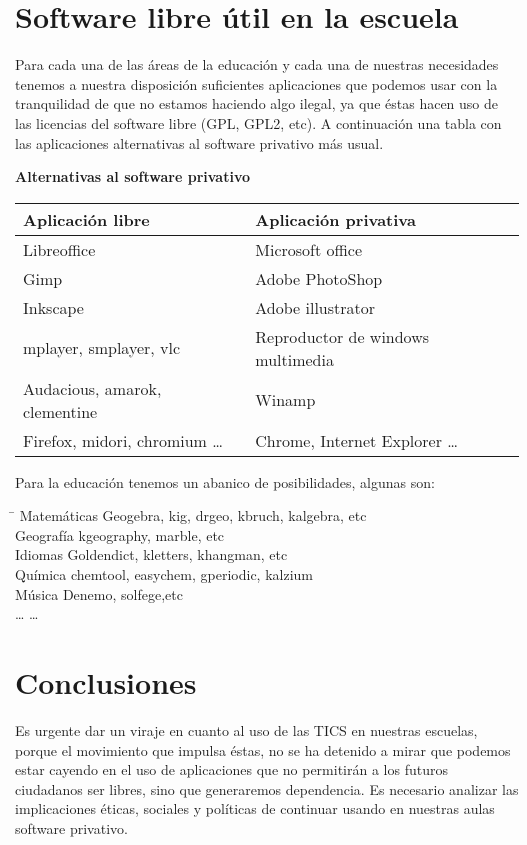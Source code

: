 \documentclass[11pt,letterpaper]{article}
\begin{document}
\section{Software libre útil en la escuela}
Para cada una de las áreas de la educación y cada una de nuestras necesidades tenemos a nuestra disposición suficientes aplicaciones que podemos usar con la tranquilidad de que no estamos haciendo algo ilegal, ya que éstas hacen uso de las licencias del software libre (GPL, GPL2, etc). A continuación una tabla con las aplicaciones alternativas al software privativo más usual.
\begin{center}
\textbf{Alternativas al software privativo}
\begin{tabular}{|l|l|}
\hline 
\textbf{Aplicación libre} & \textbf{Aplicación privativa }\\ 
\hline 
Libreoffice & Microsoft office \\ 
\hline 
Gimp & Adobe PhotoShop \\ 
\hline 
Inkscape & Adobe illustrator \\  
\hline 
mplayer, smplayer, vlc & Reproductor de windows multimedia \\ 
\hline 
Audacious, amarok, clementine & Winamp \\ 
\hline 
Firefox, midori, chromium \ldots & Chrome, Internet Explorer \ldots\\ 
\hline 
\end{tabular} 
\end{center}
Para la educación tenemos un abanico de posibilidades, algunas son:

\begin{tabbing}
\hspace{4cm}\=\kill
Matemáticas \> Geogebra, kig, drgeo, kbruch, kalgebra, etc \\ 
Geografía \> kgeography, marble, etc \\ 
Idiomas \> Goldendict, kletters, khangman, etc \\ 
Química \> chemtool, easychem, gperiodic, kalzium\\
Música \> Denemo, solfege,etc \\ 
\ldots \> \ldots
\end{tabbing} 
\section{Conclusiones}
Es urgente dar un viraje en cuanto al uso de las TICS en nuestras escuelas, porque el movimiento que impulsa éstas, no se ha detenido a mirar que podemos estar cayendo en el uso de aplicaciones que no permitirán a los futuros ciudadanos ser libres, sino que generaremos dependencia. Es necesario analizar las implicaciones éticas, sociales y políticas de continuar usando en nuestras aulas software privativo.

\end{document}
